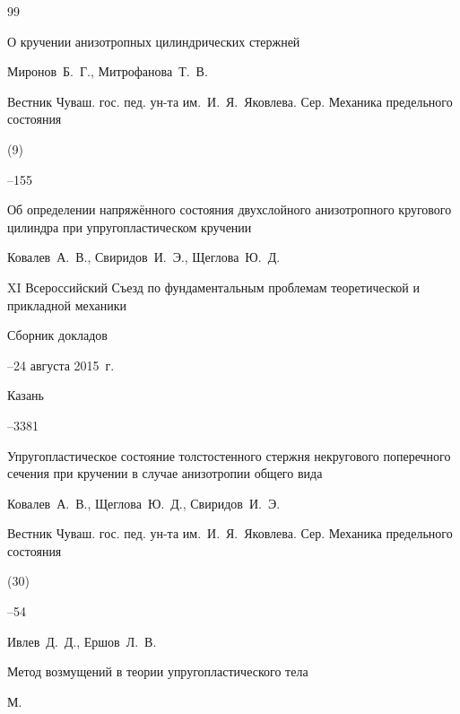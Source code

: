 \begin{thebibliography}{99}

\paper О кручении анизотропных цилиндрических стержней

\by Миронов~Б.~Г., Митрофанова~Т.~В.

\jour Вестник Чуваш. гос. пед. ун-та им.~И.~Я.~Яковлева. Сер. Механика предельного состояния


(9)

--155





\paper Об определении напряжённого состояния двухслойного анизотропного кругового цилиндра при упругопластическом кручении

\by Ковалев~А.~В., Свиридов~И.~Э., Щеглова~Ю.~Д.

\inbook  XI Всероссийский Съезд по фундаментальным проблемам теоретической и прикладной механики

\bookinfo Сборник докладов

--24 августа 2015~г.

\publaddr Казань


--3381





\paper Упругопластическое состояние толстостенного стержня некругового поперечного сечения при кручении в случае анизотропии общего вида

\by Ковалев~А.~В., Щеглова~Ю.~Д., Свиридов~И.~Э.

\jour Вестник Чуваш. гос. пед. ун-та им.~И.~Я.~Яковлева. Сер. Механика предельного состояния


(30)

--54





\by Ивлев~Д.~Д., Ершов~Л.~В.

\book Метод возмущений в теории упругопластического тела

\publaddr М.


\end{thebibliography}
